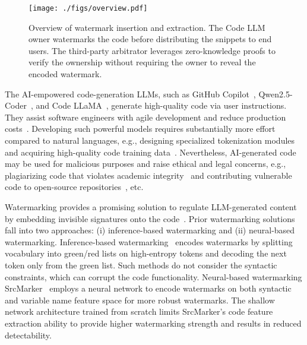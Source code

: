 
\begin{figure}[!ht]
    \centering
    \texttt{[image: ./figs/overview.pdf]}
    \vspace{-20pt}
    \caption{Overview of watermark insertion and extraction. The Code LLM owner watermarks the code before distributing the snippets to end users. The third-party arbitrator leverages zero-knowledge proofs to verify the ownership without requiring the owner to reveal the encoded watermark.}
    \label{fig:overview}
    \vspace{-15pt}
\end{figure}

The AI-empowered code-generation LLMs, such as GitHub Copilot~\cite{copilot}, Qwen2.5-Coder~\cite{hui2024qwen2}, and Code LLaMA~\cite{roziere2023code}, generate high-quality code via user instructions. They assist software engineers with agile development and reduce production costs~\cite{tan2023copilot,cai2024f}. 
Developing such powerful models requires substantially more effort compared to natural languages, e.g., designing specialized tokenization modules~\cite{li2022competition,roziere2023code} and acquiring high-quality code training data~\cite{lu2021codexglue,puri2021codenet}. Nevertheless, AI-generated code may be used for malicious purposes and raise ethical and legal concerns, e.g., plagiarizing code that violates academic integrity~\cite{cyphert2023generative,tan2024rethinking} and contributing vulnerable code to open-source repositories~\cite{panichella2024vulnerabilities,garg2024coupling}, etc.

Watermarking provides a promising solution to regulate LLM-generated content by embedding invisible signatures onto the code~\cite{huo2024token,liu2024adaptive}. Prior watermarking solutions fall into two approaches: (i) inference-based watermarking and (ii) neural-based watermarking.  Inference-based watermarking~\cite{lee2023wrote,ning2024mcgmark} encodes watermarks by splitting vocabulary into green/red lists on high-entropy tokens and decoding the next token only from the green list. Such methods do not consider the syntactic constraints, which can corrupt the code functionality.
Neural-based watermarking SrcMarker~\cite{yang2024srcmarker} employs a neural network to encode watermarks on both syntactic and variable name feature space for more robust watermarks. The shallow network architecture trained from scratch limits SrcMarker's code feature extraction ability to provide higher watermarking strength and results in reduced detectability.

